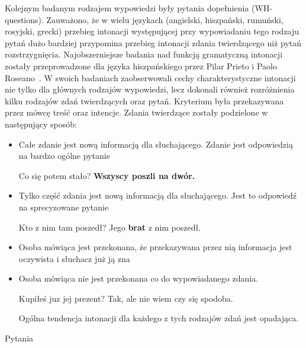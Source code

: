 \documentclass[a4paper,12 pt]{report}
\begin{document}
Kolejnym badanym rodzajem wypowiedzi były pytania dopełnienia (WH-questions). Zauważono, że w wielu językach (angielski, hiszpański, rumuński, rosyjski, grecki) przebieg intonacji występującej przy wypowiadaniu tego rodzaju pytań dużo bardziej przypomina przebieg intonacji zdania twierdzącego niż pytań rozstrzygnięcia.
\newline
\newline
Najobszerniejsze badania nad funkcją gramatyczną intonacji zostały przeprowadzone dla języka hiszpańskiego przez Pilar Prieto i Paolo Roseano~\cite{SPA}. W swoich badaniach zaobserwowali cechy charakterystyczne intonacji nie tylko dla głównych rodzajów wypowiedzi, lecz dokonali również rozróżnienia kilku rodzajów zdań twierdzących oraz pytań. Kryterium była przekazywana przez mówcę treść oraz intencje.
\newline
Zdania twierdzące zostały podzielone w następujący sposób:
\begin{itemize}
\item{Całe zdanie jest nową informacją dla słuchającego. Zdanie jest odpowiedzią na bardzo ogólne pytanie}
\begin{exe}
\ex Co się potem stało?
\newline
\textbf{Wszyscy poszli na dwór.}
\end{exe}
\item{Tylko część zdania jest nową informacją dla słuchającego. Jest to odpowiedź na sprecyzowane pytanie}
\begin{exe}
\ex Kto z nim tam poszedł?
\newline
Jego \textbf{brat} z nim poszedł.
\end{exe}

\item{Osoba mówiąca jest przekonana, że przekazywana przez nią informacja jest oczywista i słuchacz już ją zna}
\item{Osoba mówiąca nie jest przekonana co do wypowiadanego zdania.}
\begin{exe}
\ex Kupiłeś juz jej prezent?
\newline
Tak, ale nie wiem czy się spodoba.
\end{exe}
Ogólna tendencja intonacji dla każdego z tych rodzajów zdań jest opadająca.
\end{itemize}
Pytania
\end{document}
